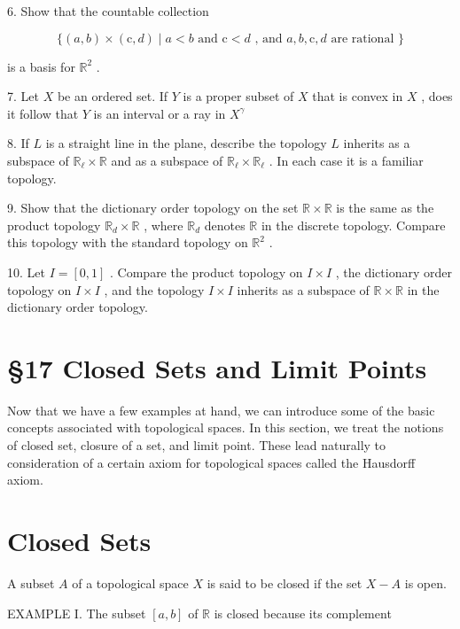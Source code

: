 6. Show that the countable collection

\[
\{ \left( {a,b}\right)  \times  \left( {\mathrm{c},d}\right)  \mid  a < b\text{ and }\mathrm{c} < d\text{ , and }a,b,\mathrm{c},d\text{ are rational }\}
\]

is a basis for \({\mathbb{R}}^{2}\) .

7. Let \(X\) be an ordered set. If \(Y\) is a proper subset of \(X\) that is convex in \(X\) , does it follow that \(Y\) is an interval or a ray in \({X}^{\gamma }\)

8. If \(L\) is a straight line in the plane, describe the topology \(L\) inherits as a subspace of \({\mathbb{R}}_{\ell } \times  \mathbb{R}\) and as a subspace of \({\mathbb{R}}_{\ell } \times  {\mathbb{R}}_{\ell }\) . In each case it is a familiar topology.

9. Show that the dictionary order topology on the set \(\mathbb{R} \times  \mathbb{R}\) is the same as the product topology \({\mathbb{R}}_{d} \times  \mathbb{R}\) , where \({\mathbb{R}}_{d}\) denotes \(\mathbb{R}\) in the discrete topology. Compare this topology with the standard topology on \({\mathbb{R}}^{2}\) .

10. Let \(I = \left\lbrack  {0,1}\right\rbrack\) . Compare the product topology on \(I \times  I\) , the dictionary order topology on \(I \times  I\) , and the topology \(I \times  I\) inherits as a subspace of \(\mathbb{R} \times  \mathbb{R}\) in the dictionary order topology.

\section*{§17 Closed Sets and Limit Points}

Now that we have a few examples at hand, we can introduce some of the basic concepts associated with topological spaces. In this section, we treat the notions of closed set, closure of a set, and limit point. These lead naturally to consideration of a certain axiom for topological spaces called the Hausdorff axiom.

\section*{Closed Sets}

A subset \(A\) of a topological space \(X\) is said to be closed if the set \(X - A\) is open.

EXAMPLE I. The subset \(\left\lbrack  {a,b}\right\rbrack\) of \(\mathbb{R}\) is closed because its complement

